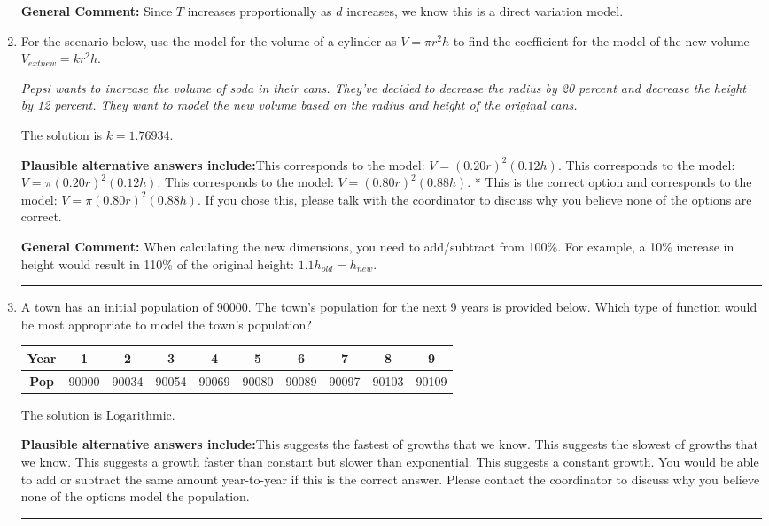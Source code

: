 \documentclass{extbook}[14pt]
\newcommand{\litem}[1]{\item #1

\rule{\textwidth}{0.4pt}}
\begin{document}
\begin{enumerate}
{\textbf{General Comment:} Since $T$ increases proportionally as $d$ increases, we know this is a direct variation model.
}
\litem{
For the scenario below, use the model for the volume of a cylinder as $V = \pi r^2 h$ to find the coefficient for the model of the new volume $V_{	ext{new}} = k r^2 h$.

\begin{center}
    \textit{ Pepsi wants to increase the volume of soda in their cans. They've decided to decrease the radius by 20 percent and decrease the height by 12 percent. They want to model the new volume based on the radius and height of the original cans. }
\end{center}
The solution is \( k = 1.76934 \).\begin{enumerate}[label=\Alph*.]
\textbf{Plausible alternative answers include:}This corresponds to the model: $V = (0.20 r)^2 (0.12 h)$.
This corresponds to the model: $V = \pi (0.20 r)^2 (0.12 h)$.
This corresponds to the model: $V = (0.80 r)^2 (0.88 h)$.
* This is the correct option and corresponds to the model: $V = \pi (0.80 r)^2 (0.88 h)$.
If you chose this, please talk with the coordinator to discuss why you believe none of the options are correct.
\end{enumerate}

\textbf{General Comment:} When calculating the new dimensions, you need to add/subtract from 100\%. For example, a 10\% increase in height would result in 110\% of the original height: $1.1h_{old} = h_{new}$.
}
\litem{
A town has an initial population of 90000. The town's population for the next 9 years is provided below. Which type of function would be most appropriate to model the town's population?


\begin{tabular}{c|c|c|c|c|c|c|c|c|c}
\textbf{Year} &1 &2 &3 &4 &5 &6 &7 &8 &9\tabularnewline \hline
\textbf{Pop} &90000 &90034 &90054 &90069 &90080 &90089 &90097 &90103 &90109\end{tabular}The solution is \( \text{Logarithmic} \).\begin{enumerate}[label=\Alph*.]
\textbf{Plausible alternative answers include:}This suggests the fastest of growths that we know.
This suggests the slowest of growths that we know.
This suggests a growth faster than constant but slower than exponential.
This suggests a constant growth. You would be able to add or subtract the same amount year-to-year if this is the correct answer.
Please contact the coordinator to discuss why you believe none of the options model the population.
\end{enumerate}

}
\end{enumerate}
\end{document}

